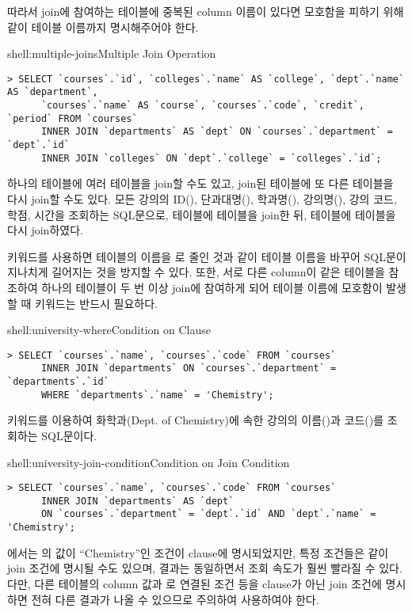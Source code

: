 따라서 join에 참여하는 테이블에 중복된 column 이름이 있다면 모호함을 피하기 위해 \와 같이 테이블 이름까지 명시해주어야 한다.

\begin{shellenv}{shell:multiple-joins}{Multiple Join Operation}
\begin{verbatim}
> SELECT `courses`.`id`, `colleges`.`name` AS `college`, `dept`.`name` AS `department`,
      `courses`.`name` AS `course`, `courses`.`code`, `credit`, `period` FROM `courses`
      INNER JOIN `departments` AS `dept` ON `courses`.`department` = `dept`.`id`
      INNER JOIN `colleges` ON `dept`.`college` = `colleges`.`id`;
\end{verbatim}
\end{shellenv}

하나의 테이블에 여러 테이블을 join할 수도 있고, join된 테이블에 또 다른 테이블을 다시 join할 수도 있다. \는 모든 강의의 ID(), 단과대명(), 학과명(), 강의명(), 강의 코드, 학점, 시간을 조회하는 SQL문으로,  테이블에  테이블을 join한 뒤,  테이블에  테이블을 다시 join하였다.

 키워드를 사용하면  테이블의 이름을 로 줄인 것과 같이 테이블 이름을 바꾸어 SQL문이 지나치게 길어지는 것을 방지할 수 있다. 또한, 서로 다른 column이 같은 테이블을 참조하여 하나의 테이블이 두 번 이상 join에 참여하게 되어 테이블 이름에 모호함이 발생할 때  키워드는 반드시 필요하다.

\begin{shellenv}{shell:university-where}{Condition on  Clause}\begin{verbatim}
> SELECT `courses`.`name`, `courses`.`code` FROM `courses`
      INNER JOIN `departments` ON `courses`.`department` = `departments`.`id`
      WHERE `departments`.`name` = 'Chemistry';
\end{verbatim}
\end{shellenv}

\는  키워드를 이용하여 화학과(Dept. of Chemistry)에 속한 강의의 이름()과 코드()를 조회하는 SQL문이다.

\begin{shellenv}{shell:university-join-condition}{Condition on Join Condition}\begin{verbatim}
> SELECT `courses`.`name`, `courses`.`code` FROM `courses`
      INNER JOIN `departments` AS `dept`
      ON `courses`.`department` = `dept`.`id` AND `dept`.`name` = 'Chemistry';
\end{verbatim}
\end{shellenv}

에서는 의 값이 ``Chemistry''인 조건이  clause에 명시되었지만, 특정 조건들은 \과 같이 join 조건에 명시될 수도 있으며, 결과는 동일하면서 조회 속도가 훨씬 빨라질 수 있다. 다만, 다른 테이블의 column 값과 로 연결된 조건 등을  clause가 아닌 join 조건에 명시하면 전혀 다른 결과가 나올 수 있으므로 주의하여 사용하여야 한다.

